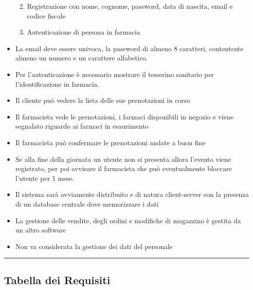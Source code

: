 \begin{itemize}
  \begin{enumerate}
  \def\labelenumi{\arabic{enumi}.}
  \itemsep1pt\parskip0pt
  \item
    Registrazione con nome, cognome, password, data di nascita, email e
    codice fiscale
  \item
    Autenticazione di persona in farmacia
  \end{enumerate}
\item
  La email deve essere univoca, la password di almeno 8 caratteri,
  contentente almeno un numero e un carattere alfabetico.
\item
  Per l'autenticazione è necessario mostrare il tesserino sanitario per
  l'identificazione in farmacia.
\item
  Il cliente può vedere la lista delle sue prenotazioni in corso
\item
  Il farmacista vede le prenotazioni, i farmaci disponibili in negozio e
  viene segnalato riguardo ai farmaci in esaurimento
\item
  Il farmacista può confermare le prenotazioni andate a buon fine
\item
  Se alla fine della giornata un utente non si presenta allora l'evento
  viene registrato, per poi avvisare il farmacista che può eventualmente
  bloccare l'utente per 1 mese.
\item
  Il sistema sarà ovviamente distribuito e di natura client-server con
  la presenza di un database centrale dove memorizzare i dati
\item
  La gestione delle vendite, degli ordini e modifiche di magazzino è
  gestita da un altro software
\item
  Non va considerata la gestione dei dati del personale
\end{itemize}

\begin{center}\rule{3in}{0.4pt}\end{center}

\subsection{Tabella dei Requisiti}\label{tabella-dei-requisiti}

